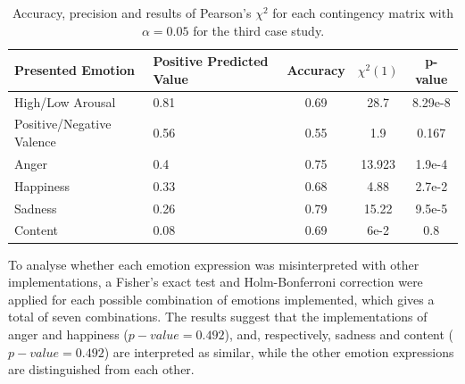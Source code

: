 \begin{table}
	\begin{center}
\small
		\caption{Accuracy, precision and results of Pearson's $\chi^2$ for each contingency matrix with $\alpha = 0.05$ for the third case study.} 
\label{table:Precision}
		\begin{tabular}{|p{3 cm}|p{2 cm}|c|c|c|}
		\hline
		\textbf{Presented Emotion} & \textbf{Positive Predicted Value} & \textbf{Accuracy} & \textbf{$\chi^2(1)$} & \textbf{p-value}\\
		\hline		
		High/Low Arousal & 0.81 & 0.69 & 28.7 & 8.29e-8\\
		\hline
		Positive/Negative Valence & 0.56 & 0.55 & 1.9 & 0.167\\
		\hline
		\hline
		Anger & 0.4 & 0.75&13.923 & 1.9e-4\\
		\hline
		Happiness & 0.33 & 0.68&4.88&2.7e-2\\
		\hline
		Sadness & 0.26 & 0.79&15.22&9.5e-5\\
		\hline
		Content & 0.08 & 0.69&6e-2&0.8 \\		 
		\hline
		\end{tabular}
	\end{center}
\end{table}
To analyse whether each emotion expression was misinterpreted with other implementations, a Fisher's exact test and Holm-Bonferroni correction were applied for each possible combination of emotions implemented, which gives a total of seven combinations. %
The results suggest that the implementations of anger and happiness ($p-value=0.492$), and, respectively, sadness and content ($p-value=0.492$) are interpreted as similar, while the other emotion expressions are distinguished from each other.\\ %

